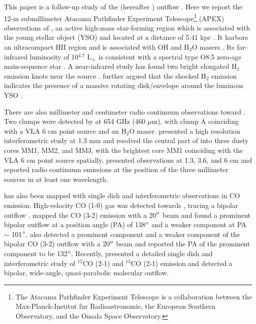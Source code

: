 This paper is a follow-up study of the  (hereafter ) outflow \citep{2009ApJ...696...66Q}. Here we report the 12-m submillimeter Atacama Pathfinder Experiment Telescope\footnote{    The Atacama Pathfinder Experiment Telescope is a collaboration between the Max-Planck-Institut f$\ddot{\mathrm{u}}$r Radioastronomie, the European Southern Observatory, and the Onsala Space Observatory.} (APEX) observations of , an active high-mass star-forming region which is associated with the young stellar object (YSO)  and located at a distance of 5.41 kpc \citep{2015PASJ...67...69S}. It harbors an ultracompact HII region and is associated with OH and H$_2$O masers \citep{1993AJ....105.1495H,1997MNRAS.289..203C,1998AJ....116.1897M,1999ApJS..123..487M,2003MNRAS.341..551C}. Its far-infrared luminosity of 10$^{4.7}$ L$_\sun$ is consistent with a spectral type O8.5 zero-age main-sequence star \citep{1998AJ....116.1897M}. A near-infrared study has found two bright elongated H$_2$ emission knots near the source \citep{2002ApJ...576..313K}. \citet{2003A&A...412..175K} further argued that the shocked H$_2$ emission indicates the presence of a massive rotating disk/envelope around the luminous YSO . 

There are also millimeter and centimeter radio continuum observations toward . Two clumps were detected by \citet{2007ApJ...654L..87C} at 654 GHz (460 $\mu$m), with clump A coinciding with a VLA 6 cm point source \citep{1993AJ....105.1495H} and an H$_2$O maser. \citet{2009ApJ...696...66Q} presented a high resolution interferometric study at 1.3 mm and resolved the central part of  into three dusty cores MM1, MM2, and MM3, with the brightest core MM1 coinciding with the VLA 6 cm point source spatially. \citet{2011AJ....142..147T} presented observations at 1.3, 3.6, and 6 cm and reported radio continuum emissions at the position of the three millimeter sources in at least one wavelength.

 has also been mapped with single dish and interferometric observations in CO emission. High-velocity CO (1-0) gas was detected towards  \citep{1991AJ....101.1435M,1996ApJ...457..267S}, tracing a bipolar outflow \citep{1996ApJ...457..267S}. \citet{1997PhDT........21H} mapped the CO (3-2) emission with a 20${\mbox{$^{\prime\prime}$}}$ beam and found a prominent bipolar outflow at a position angle (PA) of 138${\mbox{$^\circ$}}$ and a weaker component at PA $\sim$ 101${\mbox{$^\circ$}}$. \citet{2003A&A...412..175K} also detected a prominent component and a weaker component of the bipolar CO (3-2) outflow with a 20${\mbox{$^{\prime\prime}$}}$ beam and reported the PA of the prominent component to be 132${\mbox{$^\circ$}}$. Recently, \citet{2009ApJ...696...66Q} presented a detailed single dish and interferometric study of $^{12}$CO (2-1) and $^{13}$CO (2-1) emission and detected a bipolar, wide-angle, quasi-parabolic molecular outflow. 

